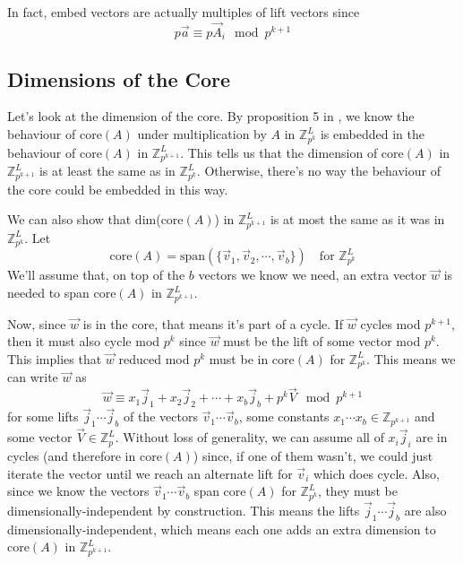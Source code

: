 \documentclass[a4paper, 12pt, reqno]{amsart}
\newcommand{\ssubsection}[1]{\vspace{0.25cm}\subsection{#1}}
\begin{document}
	In fact, embed vectors are actually multiples of lift vectors since
	\[
		p\vec{a} \equiv p\vec{A}_i \mod{p^{k+1}}
	\]
	
	\ssubsection{Dimensions of the Core}
	Let's look at the dimension of the core. By proposition 5 in \citet{Mendivil2012}, we know
	the behaviour of core$(A)$ under multiplication by $A$ in $\mathds{Z}_{p^{k}}^{L}$ is embedded in the 
	behaviour of core$(A)$ in $\mathds{Z}_{p^{k+1}}^{L}$. This tells us that the dimension of core$(A)$ in 
	$\mathds{Z}_{p^{k+1}}^{L}$ is at least the same as in $\mathds{Z}_{p^{k}}^{L}$. Otherwise, there's no 
	way the behaviour of the core could be embedded in this way.
	
	We can also show that dim(core$(A)$) in $\mathds{Z}_{p^{k+1}}^{L}$ is at most the same as it was in
	$\mathds{Z}_{p^k}^{L}$. Let
	\[
		\text{core}(A) = \text{span}(\{\vec{v}_{1}, \vec{v}_{2}, \cdots, \vec{v}_{b}\}) \quad \text{for} 
		\,\, \mathds{Z}_{p^k}^{L}
	\]
	We'll assume that, on top of the $b$ vectors we know we need, an extra vector $\vec{w}$ is needed to
	span core$(A)$ in $\mathds{Z}_{p^{k+1}}^{L}$.
	
	Now, since $\vec{w}$ is in the core, that means it's part of a cycle. If $\vec{w}$ cycles mod $p^{k+1}$, 
	then it must also cycle mod $p^{k}$ since $\vec{w}$ must be the lift of some vector mod $p^{k}$. This 
	implies that $\vec{w}$ reduced mod $p^{k}$ must be in core$(A)$ for $\mathds{Z}_{p^k}^{L}$. This means 
	we can write $\vec{w}$ as
	\[
		\vec{w} \equiv x_{1}\vec{j}_{1} + x_{2}\vec{j}_{2} + \cdots + x_{b}\vec{j}_{b} + p^{k}\vec{V} \mod{p^{k+1}}
	\]
	for some lifts $\vec{j}_1 \cdots \vec{j}_b$ of the vectors $\vec{v}_1 \cdots \vec{v}_b$, some constants 
	$x_{1} \cdots x_{b} \in \mathds{Z}_{p^{k+1}}$ and some vector $\vec{V} \in \mathds{Z}_{p}^{L}$. Without loss
	of generality, we can assume all of $x_{i}\vec{j}_i$ are in cycles (and therefore in core$(A)$) since, if 
	one of them wasn't, we could just iterate the vector until we reach an alternate lift for $\vec{v}_i$ which 
	does cycle. Also, since we know the vectors $\vec{v}_1 \cdots \vec{v}_b$ span core$(A)$ for $\mathds{Z}_{p^k}^L$, 
	they must be dimensionally-independent by construction. This means the lifts $\vec{j}_1 \cdots \vec{j}_b$ are 
	also dimensionally-independent, which means each one adds an extra dimension to core$(A)$ in 
	$\mathds{Z}_{p^{k+1}}^L$.
	
\end{document}
